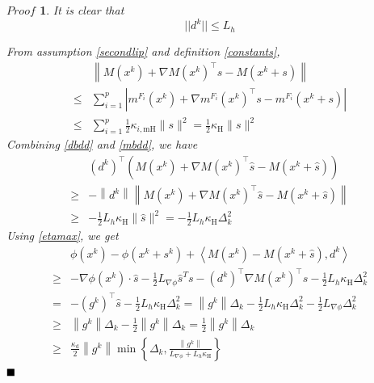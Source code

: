 \documentclass[10pt, oneside]{article}
\newtheorem*{Proof}{$Proof$}
\begin{document}
\begin{Proof}
It is clear that 
\begin{equation}
\label{dbdd}
||d^k||\leq L_h
\end{equation}

From assumption \ref{secondlip} and definition \ref{constants}, 
\begin{equation}
\label{mbdd}
\begin{aligned}
&\left\|M\left(x^{k}\right)+\nabla M\left(x^{k}\right)^{\top} s-M\left(x^{k}+s\right)\right\| \\
\leq & \sum_{i=1}^{p}\left|m^{F_{i}}\left(x^{k}\right)+\nabla m^{F_{i}}\left(x^{k}\right)^{\top} s-m^{F_{i}}\left(x^{k}+s\right)\right| \\
\leq & \sum_{i=1}^{p} \frac{1}{2} \kappa_{i, \mathrm{mH}}\|s\|^{2}=\frac{1}{2} \kappa_{\mathrm{H}}\|s\|^{2}
\end{aligned}
\end{equation}
Combining \ref{dbdd} and \ref{mbdd}, we have 
$$
\begin{aligned}
&\left(d^{k}\right)^{\top}\left(M\left(x^{k}\right)+\nabla M\left(x^{k}\right)^{\top} \hat{s}-M\left(x^{k}+\hat{s}\right)\right) \\
\geq &-\left\|d^{k}\right\|\left\|M\left(x^{k}\right)+\nabla M\left(x^{k}\right)^{\top} \hat{s}-M\left(x^{k}+\hat{s}\right)\right\| \\
\geq &-\frac{1}{2} L_{h} \kappa_{\mathrm{H}}\|\hat{s}\|^{2}=-\frac{1}{2} L_{h} \kappa_{\mathrm{H}} \Delta_{k}^{2}
\end{aligned}
$$
Using \ref{etamax}, we get 
$$
\begin{aligned}
&\phi(x^k)-\phi(x^k+s^k)+\left\langle M\left(x^{k}\right)-M\left(x^{k}+\hat{s}\right), d^{k}\right\rangle \\
\geq&-\nabla\phi(x^k)\cdot \hat{s}-\frac{1}{2}L_{\nabla \phi}\hat{s}^Ts-\left(d^{k}\right)^{\top} \nabla M\left(x^{k}\right)^{\top} \hat{s}-\frac{1}{2} L_{h} \kappa_{\mathrm{H}} \Delta_{k}^{2} \\
=&-\left(g^{k}\right)^{\top} \hat{s}-\frac{1}{2} L_{h} \kappa_{\mathrm{H}} \Delta_{k}^{2}=\left\|g^{k}\right\| \Delta_{k}-\frac{1}{2} L_{h} \kappa_{\mathrm{H}} \Delta_{k}^{2} -\frac{1}{2}L_{\nabla \phi}\Delta_k^2\\
\geq &\left\|g^{k}\right\| \Delta_{k}-\frac{1}{2}\left\|g^{k}\right\| \Delta_{k}=\frac{1}{2}\left\|g^{k}\right\| \Delta_{k} \\
\geq &\frac{\kappa_{\mathrm{d}}}{2}\left\|g^{k}\right\| \min \left\{\Delta_{k}, \frac{\left\|g^{k}\right\|}{L_{\nabla\phi}+L_{h} \kappa_{\mathrm{H}}}\right\}
\end{aligned}
$$
$\hfill\blacksquare$
\end{Proof}
\end{document}
